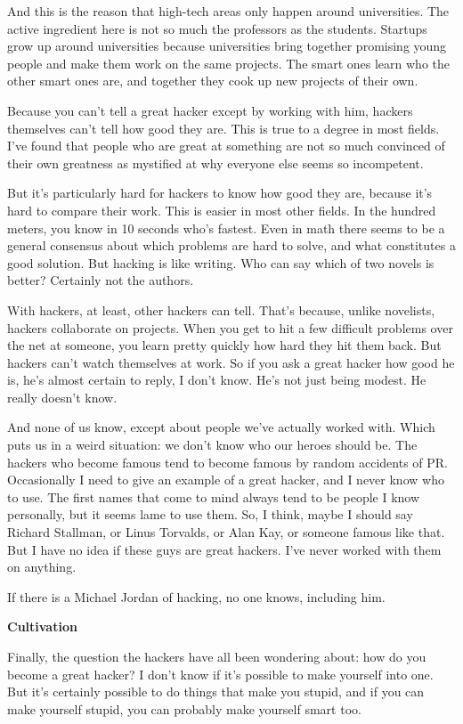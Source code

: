 \documentclass[12pt]{book}
\begin{document}
And this is the reason that high-tech areas only happen around
universities. The active ingredient here is not so much the professors
as the students. Startups grow up around universities because
universities bring together promising young people and make them work on
the same projects. The smart ones learn who the other smart ones are,
and together they cook up new projects of their own.

Because you can't tell a great hacker except by working with him,
hackers themselves can't tell how good they are. This is true to a
degree in most fields. I've found that people who are great at something
are not so much convinced of their own greatness as mystified at why
everyone else seems so incompetent.

But it's particularly hard for hackers to know how good they are,
because it's hard to compare their work. This is easier in most other
fields. In the hundred meters, you know in 10 seconds who's fastest.
Even in math there seems to be a general consensus about which problems
are hard to solve, and what constitutes a good solution. But hacking is
like writing. Who can say which of two novels is better? Certainly not
the authors.

With hackers, at least, other hackers can tell. That's because, unlike
novelists, hackers collaborate on projects. When you get to hit a few
difficult problems over the net at someone, you learn pretty quickly how
hard they hit them back. But hackers can't watch themselves at work. So
if you ask a great hacker how good he is, he's almost certain to reply,
I don't know. He's not just being modest. He really doesn't know.

And none of us know, except about people we've actually worked with.
Which puts us in a weird situation: we don't know who our heroes should
be. The hackers who become famous tend to become famous by random
accidents of PR. Occasionally I need to give an example of a great
hacker, and I never know who to use. The first names that come to mind
always tend to be people I know personally, but it seems lame to use
them. So, I think, maybe I should say Richard Stallman, or Linus
Torvalds, or Alan Kay, or someone famous like that. But I have no idea
if these guys are great hackers. I've never worked with them on
anything.

If there is a Michael Jordan of hacking, no one knows, including him.

\textbf{Cultivation}

Finally, the question the hackers have all been wondering about: how do
you become a great hacker? I don't know if it's possible to make
yourself into one. But it's certainly possible to do things that make
you stupid, and if you can make yourself stupid, you can probably make
yourself smart too.
\end{document}
